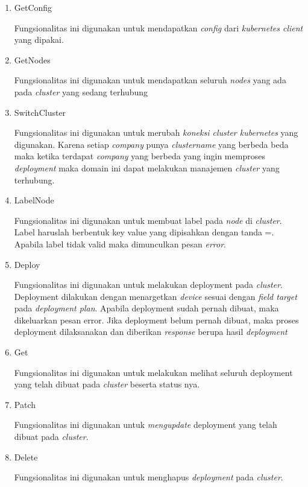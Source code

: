 \begin{enumerate}
    \item GetConfig

          Fungsionalitas ini digunakan untuk mendapatkan \textit{config} dari \textit{kubernetes client} yang dipakai.

    \item GetNodes

          Fungsionalitas ini digunakan untuk mendapatkan seluruh \textit{nodes} yang ada pada \textit{cluster} yang sedang terhubung

    \item SwitchCluster

          Fungsionalitas ini digunakan untuk merubah \textit{koneksi cluster kubernetes} yang digunakan. Karena setiap \textit{company} punya \textit{cluster\textunderscore name} yang berbeda beda maka ketika terdapat \textit{company} yang berbeda yang ingin memproses \textit{deployment} maka domain ini dapat melakukan manajemen \textit{cluster} yang terhubung.

    \item LabelNode

          Fungsionalitas ini digunakan untuk membuat label pada \textit{node} di \textit{cluster}. Label haruslah berbentuk key value yang dipisahkan dengan tanda =. Apabila label tidak valid maka dimunculkan pesan \textit{error}.

    \item Deploy

          Fungsionalitas ini digunakan untuk melakukan deployment pada \textit{cluster}. Deployment dilakukan dengan menargetkan \textit{device} sesuai dengan \textit{field target} pada \textit{deployment plan}. Apabila deployment sudah pernah dibuat, maka dikeluarkan pesan error. Jika deployment belum pernah dibuat, maka proses deployment dilaksanakan dan diberikan \textit{response} berupa hasil \textit{deployment}

    \item Get

          Fungsionalitas ini digunakan untuk melakukan melihat seluruh deployment yang telah dibuat pada \textit{cluster} beserta status nya.



    \item Patch

          Fungsionalitas ini digunakan untuk \textit{mengupdate} deployment yang telah dibuat pada \textit{cluster}.

    \item Delete

          Fungsionalitas ini digunakan untuk menghapus \textit{deployment} pada \textit{cluster}.

\end{enumerate}